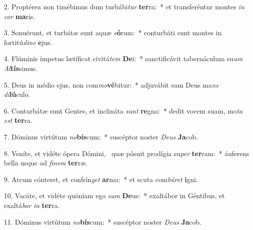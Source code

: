 2. Proptérea non timébimus dum turbábi\textit{tur} \textbf{ter}ra:~*  et transferéntur montes \textit{in} \textit{cor} \textbf{ma}ris.\

3. Sonuérunt, et turbátæ sunt aquæ \textit{e}\textbf{ó}rum:~*  conturbáti sunt montes in fortitú\textit{di}\textit{ne} \textbf{e}jus.\

4. Flúminis ímpetus lætíficat civitá\textit{tem} \textbf{De}i:~*  sanctificávit tabernáculum su\textit{um} \textit{Al}\textbf{tís}simus.\

5. Deus in médio ejus, non com\textit{mo}\textbf{vé}bitur:~*  adjuvábit eam Deus ma\textit{ne} \textit{di}\textbf{lú}culo.\

6. Conturbátæ sunt Gentes, et inclináta \textit{sunt} \textbf{re}gna:~*  dedit vocem suam, mo\textit{ta} \textit{est} \textbf{ter}ra.\

7. Dóminus virtútum \textit{no}\textbf{bís}cum:~*  suscéptor noster \textit{De}\textit{us} \textbf{Ja}cob.\

8. Veníte, et vidéte ópera Dómini, \dag\  quæ pósuit prodígia su\textit{per} \textbf{ter}ram:~*  áuferens bella usque ad \textit{fi}\textit{nem} \textbf{ter}ræ.\

9. Arcum cónteret, et confrín\textit{get} \textbf{ar}ma:~*  et scuta com\textit{bú}\textit{ret} \textbf{i}gni.\

10. Vacáte, et vidéte quóniam ego \textit{sum} \textbf{De}us:~*  exaltábor in Géntibus, et exaltá\textit{bor} \textit{in} \textbf{ter}ra.\

11. Dóminus virtútum \textit{no}\textbf{bís}cum:~*  suscéptor noster \textit{De}\textit{us} \textbf{Ja}cob.\

